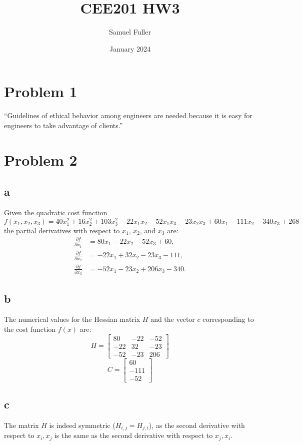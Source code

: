 \documentclass[10pt]{article}
\title{CEE201 HW3}
\author{Samuel Fuller}
\date{January 2024}
\begin{document}
\maketitle

\section{Problem 1}

“Guidelines of ethical behavior among engineers are needed
because it is easy for engineers to take advantage of clients.”

\section{Problem 2}
\subsection{a}
Given the quadratic cost function
\[ f(x_1, x_2, x_3) = 40x_1^2 + 16x_2^2 + 103x_3^2 - 22x_1x_2 - 52x_1x_3 - 23x_2x_3 + 60x_1 - 111x_2 - 340x_3 + 268 \]
the partial derivatives with respect to \( x_1 \), \( x_2 \), and \( x_3 \) are:
\begin{align*}
\frac{\partial f}{\partial x_1} &= 80x_1 -22x_2 - 52x_3 + 60, \\
\frac{\partial f}{\partial x_2} &= -22x_1 + 32x_2 - 23x_3 - 111, \\
\frac{\partial f}{\partial x_3} &= -52x_1 - 23x_2 + 206x_3 - 340.
\end{align*}

\subsection{b}
The numerical values for the Hessian matrix \( H \) and the vector \( c \) corresponding to the cost function \( f(x) \) are:
\[
H = \begin{bmatrix}
80 & -22 & -52 \\
-22 & 32 & -23 \\
-52 & -23 & 206
\end{bmatrix}
\]
\[
C = \begin{bmatrix}
60  \\
-111  \\
-52 
\end{bmatrix}
\]

\subsection{c}
The matrix \( H \) is indeed symmetric ($H_{i,j} = H_{j,i}$), as the second derivative with respect to $x_i,x_j$ is the same as the second derivative with respect to $x_j,x_i$.
\end{document}
